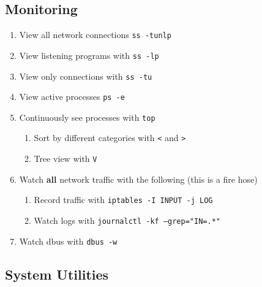 \documentclass[12pt,letterpaper]{article}
\def\code#1{\textcolor{c2}{\texttt{#1}}}
\def\bf#1{\textbf{#1}}
\begin{document}
\subsection{Monitoring}

\begin{enumerate}
	\item View all network connections \code{ss -tunlp}
	\item View listening programs with \code{ss -lp}
	\item View only connections with \code{ss -tu}
	\item View active processes \code{ps -e}
	\item Continuously see processes with \code{top}
		\begin{enumerate}
			\item Sort by different categories with \code{<} and \code{>}
			\item Tree view with \code{V}
		\end{enumerate}
	\item Watch \bf{all} network traffic with the following (this is a fire hose)
		\begin{enumerate}
			\item Record traffic with \code{iptables -I INPUT -j LOG}
			\item Watch logs with \code{journalctl -kf --grep="IN=.*"}
		\end{enumerate}
	\item Watch dbus with \code{dbus -w}
\end{enumerate}

\subsection{System Utilities}
\end{document}

